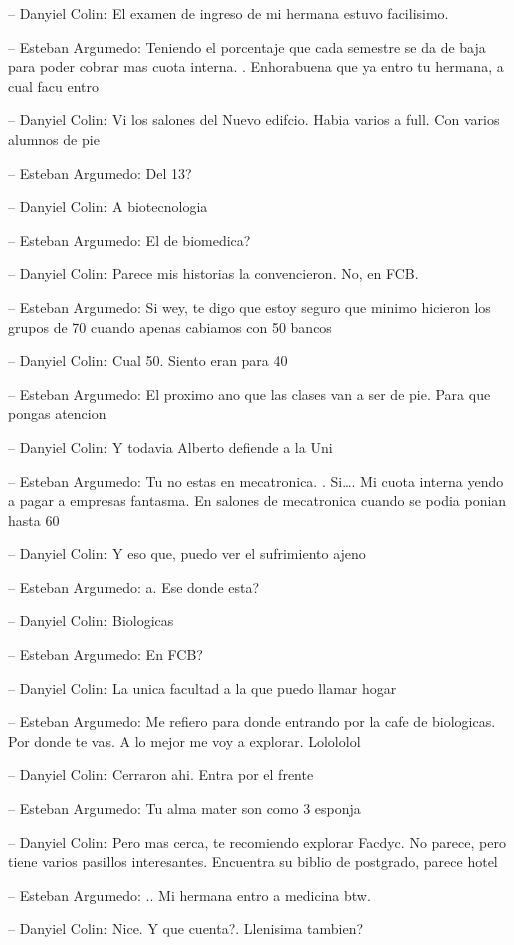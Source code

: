 -- Danyiel Colin: El examen de ingreso de mi hermana estuvo facilisimo.

-- Esteban Argumedo: Teniendo el porcentaje que cada semestre se da de
baja para poder cobrar mas cuota interna. . Enhorabuena que ya entro tu
hermana, a cual facu entro

-- Danyiel Colin: Vi los salones del Nuevo edifcio. Habia varios a full.
Con varios alumnos de pie

-- Esteban Argumedo: Del 13?

-- Danyiel Colin: A biotecnologia

-- Esteban Argumedo: El de biomedica?

-- Danyiel Colin: Parece mis historias la convencieron. No, en FCB.

-- Esteban Argumedo: Si wey, te digo que estoy seguro que minimo
hicieron los grupos de 70 cuando apenas cabiamos con 50 bancos

-- Danyiel Colin: Cual 50. Siento eran para 40

-- Esteban Argumedo: El proximo ano que las clases van a ser de pie.
Para que pongas atencion

-- Danyiel Colin: Y todavia Alberto defiende a la Uni

-- Esteban Argumedo: Tu no estas en mecatronica. . Si\ldots. Mi cuota
interna yendo a pagar a empresas fantasma. En salones de mecatronica
cuando se podia ponian hasta 60

-- Danyiel Colin: Y eso que, puedo ver el sufrimiento ajeno

-- Esteban Argumedo: a. Ese donde esta?

-- Danyiel Colin: Biologicas

-- Esteban Argumedo: En FCB?

-- Danyiel Colin: La unica facultad a la que puedo llamar hogar

-- Esteban Argumedo: Me refiero para donde entrando por la cafe de
biologicas. Por donde te vas. A lo mejor me voy a explorar. Lolololol

-- Danyiel Colin: Cerraron ahi. Entra por el frente

-- Esteban Argumedo: Tu alma mater son como 3 esponja

-- Danyiel Colin: Pero mas cerca, te recomiendo explorar Facdyc. No
parece, pero tiene varios pasillos interesantes. Encuentra su biblio de
postgrado, parece hotel

-- Esteban Argumedo: .. Mi hermana entro a medicina btw.

-- Danyiel Colin: Nice. Y que cuenta?. Llenisima tambien?

